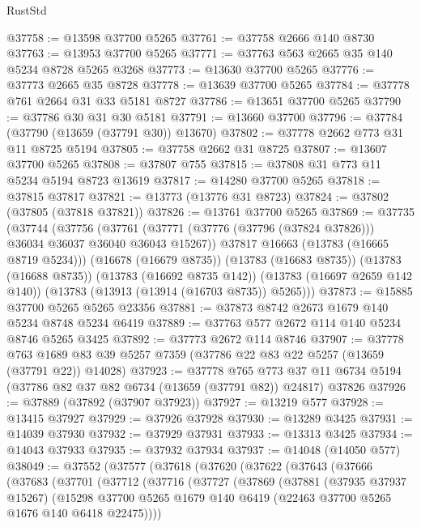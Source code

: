 \begin{lexlean}{RustStd}
\begin{coremodule}
@37758 := @13598 @37700 @5265
@37761 := @37758 @2666 @140 @8730
@37763 := @13953 @37700 @5265
@37771 := @37763 @563 @2665 @35 @140 @5234 @8728 @5265 @3268
@37773 := @13630 @37700 @5265
@37776 := @37773 @2665 @35 @8728
@37778 := @13639 @37700 @5265
@37784 := @37778 @761 @2664 @31 @33 @5181 @8727
@37786 := @13651 @37700 @5265
@37790 := @37786 @30 @31 @30 @5181
@37791 := @13660 @37700
@37796 := @37784 (@37790 (@13659 (@37791 @30)) @13670)
@37802 := @37778 @2662 @773 @31 @11 @8725 @5194
@37805 := @37758 @2662 @31 @8725
@37807 := @13607 @37700 @5265
@37808 := @37807 @755
@37815 := @37808 @31 @773 @11 @5234 @5194 @8723 @13619
@37817 := @14280 @37700 @5265
@37818 := @37815 @37817
@37821 := @13773 (@13776 @31 @8723)
@37824 := @37802 (@37805 (@37818 @37821))
@37826 := @13761 @37700 @5265
@37869 := @37735
    (@37744
      (@37756
        (@37761 (@37771 (@37776 (@37796 (@37824 @37826))) @36034 @36037 @36040 @36043 @15267))
        @37817
        @16663
        (@13783 (@16665 @8719 @5234)))
      (@16678 (@16679 @8735))
      (@13783 (@16683 @8735))
      (@13783 (@16688 @8735))
      (@13783 (@16692 @8735 @142))
      (@13783 (@16697 @2659 @142 @140))
      (@13783 (@13913 (@13914 (@16703 @8735)) @5265)))
@37873 := @15885 @37700 @5265 @5265 @23356
@37881 := @37873 @8742 @2673 @1679 @140 @5234 @8748 @5234 @6419
@37889 := @37763 @577 @2672 @114 @140 @5234 @8746 @5265 @3425
@37892 := @37773 @2672 @114 @8746
@37907 := @37778
    @763
    @1689
    @83
    @39
    @5257
    @7359
    (@37786 @22 @83 @22 @5257 (@13659 (@37791 @22)) @14028)
@37923 := @37778
    @765
    @773
    @37
    @11
    @6734
    @5194
    (@37786 @82 @37 @82 @6734 (@13659 (@37791 @82)) @24817)
    @37826
@37926 := @37889 (@37892 (@37907 @37923))
@37927 := @13219 @577
@37928 := @13415 @37927
@37929 := @37926 @37928
@37930 := @13289 @3425
@37931 := @14039 @37930
@37932 := @37929 @37931
@37933 := @13313 @3425
@37934 := @14043 @37933
@37935 := @37932 @37934
@37937 := @14048 (@14050 @577)
@38049 := @37552
    (@37577
      (@37618
        (@37620
          (@37622
            (@37643
              (@37666
                (@37683
                  (@37701
                    (@37712
                      (@37716
                        (@37727
                          (@37869
                            (@37881
                              (@37935 @37937 @15267)
                              (@15298
                                @37700
                                @5265
                                @1679
                                @140
                                @6419
                                (@22463 @37700 @5265 @1676 @140 @6418 @22475))))

\end{coremodule}
\end{lexlean}
